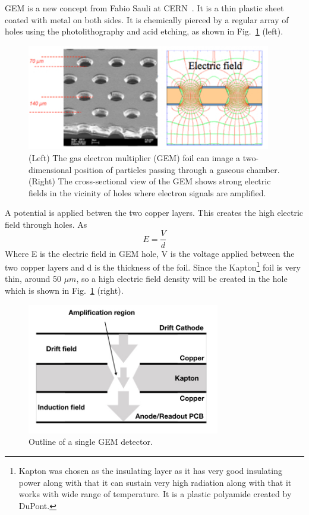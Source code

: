 GEM is a new concept from Fabio Sauli at CERN~\cite{Sauli1997}.
It is a thin plastic sheet coated with metal on both sides. It is chemically pierced by a regular array of holes using the photolithography and acid etching, as shown in Fig.~\ref{fig:gem} (left).
\begin{figure}[!htbp]
    \centering
    \includegraphics[width=0.95\textwidth]{figures/GEM/KEKDTP3.jpg}
    \caption{(Left) The gas electron multiplier (GEM) foil can image a two-dimensional position of particles passing through a gaseous chamber. (Right) The cross-sectional view of the GEM shows strong electric fields in the vicinity of holes where electron signals are amplified.}
    \label{fig:gem}
\end{figure}

A potential is applied betwen the two copper layers. This creates the high electric field through holes. As
\begin{equation}
    E = \frac{V}{d}
\end{equation}
Where E is the electric field in GEM hole, V is the voltage applied between the two copper layers and d is the thickness of the foil. Since the Kapton\footnote{Kapton was chosen as the insulating layer as it has very good insulating power along with that it can sustain very high radiation along with that it works with wide range of temperature. It is a plastic polyamide created by DuPont.} foil is very thin, around 50 $\mu m$, so a high electric field density will be created in the hole which is shown in Fig.~\ref{fig:gem} (right).
\begin{figure}[htbp]
    \centering
    \includegraphics[width=0.75\textwidth]{figures/GEM/SingleGEM_Detector.jpeg}
    \caption{Outline of a single GEM detector.}
    \label{fig:gemOutline}
\end{figure}

